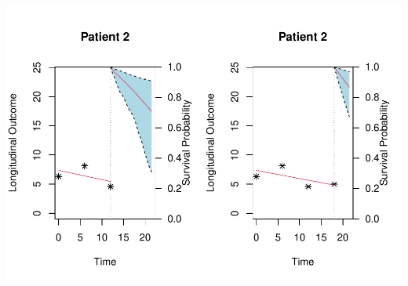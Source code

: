 \documentclass[
]{book}
\begin{document}
\includegraphics{fig_out/unnamed-chunk-175-1.pdf}
\end{document}
